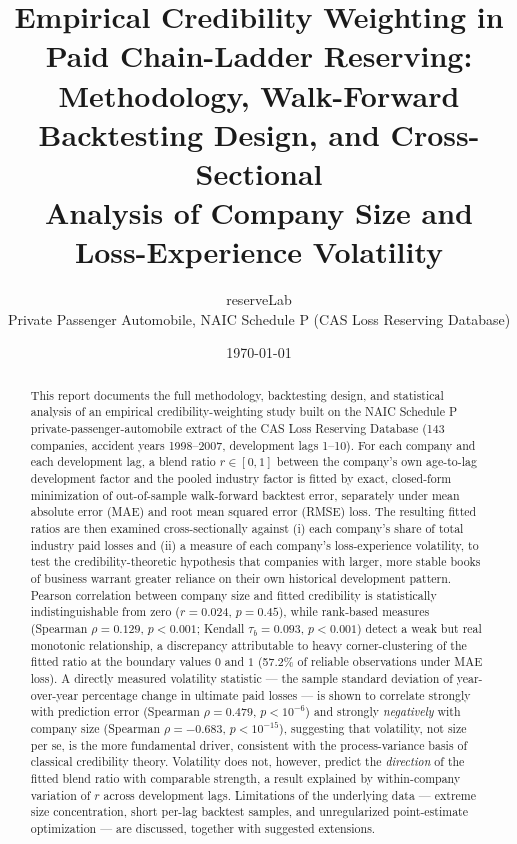 \documentclass[11pt]{article}
\title{\textbf{Empirical Credibility Weighting in Paid Chain-Ladder Reserving:}\\
\large Methodology, Walk-Forward Backtesting Design, and Cross-Sectional\\
Analysis of Company Size and Loss-Experience Volatility}
\author{reserveLab \\ \small Private Passenger Automobile, NAIC Schedule P (CAS Loss Reserving Database)}
\date{\today}
\begin{document}
\maketitle

\begin{abstract}
\noindent
This report documents the full methodology, backtesting design, and statistical analysis of an
empirical credibility-weighting study built on the NAIC Schedule P private-passenger-automobile
extract of the CAS Loss Reserving Database (143 companies, accident years 1998--2007, development
lags 1--10). For each company and each development lag, a blend ratio $r \in [0,1]$ between the
company's own age-to-lag development factor and the pooled industry factor is fitted by exact,
closed-form minimization of out-of-sample walk-forward backtest error, separately under mean
absolute error (MAE) and root mean squared error (RMSE) loss. The resulting fitted ratios are
then examined cross-sectionally against (i) each company's share of total industry paid losses
and (ii) a measure of each company's loss-experience volatility, to test the credibility-theoretic
hypothesis that companies with larger, more stable books of business warrant greater reliance on
their own historical development pattern. Pearson correlation between company size and fitted
credibility is statistically indistinguishable from zero ($r=0.024$, $p=0.45$), while
rank-based measures (Spearman $\rho = 0.129$, $p<0.001$; Kendall $\tau_b = 0.093$, $p<0.001$)
detect a weak but real monotonic relationship, a discrepancy attributable to heavy corner-clustering
of the fitted ratio at the boundary values $0$ and $1$ (57.2\% of reliable observations under MAE
loss). A directly measured volatility statistic --- the sample standard deviation of year-over-year
percentage change in ultimate paid losses --- is shown to correlate strongly with prediction error
(Spearman $\rho=0.479$, $p<10^{-6}$) and strongly \emph{negatively} with company size
(Spearman $\rho=-0.683$, $p<10^{-15}$), suggesting that volatility, not size per se, is the more
fundamental driver, consistent with the process-variance basis of classical credibility theory.
Volatility does not, however, predict the \emph{direction} of the fitted blend ratio with comparable
strength, a result explained by within-company variation of $r$ across development lags. Limitations
of the underlying data --- extreme size concentration, short per-lag backtest samples, and
unregularized point-estimate optimization --- are discussed, together with suggested extensions.
\end{abstract}
\end{document}
